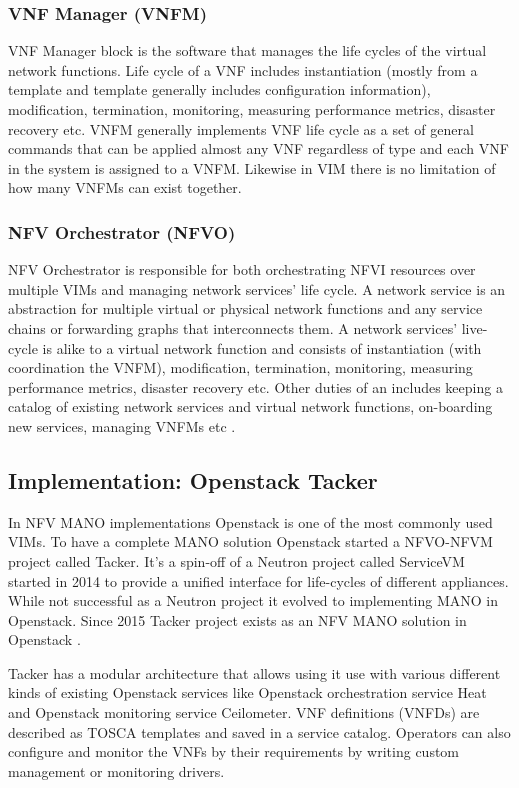 \documentclass[12pt,oneandhalf,chaparabic,ceng,ms,eng,oneside,pntc]{gsufbe}
\begin{document}
\subsubsection{VNF Manager (VNFM)}
VNF Manager block is the software that manages the life cycles of the virtual network functions. Life
cycle of a VNF includes instantiation (mostly from a template and template generally includes
configuration information), modification, termination, monitoring, measuring performance metrics,
disaster recovery etc. VNFM generally implements VNF life cycle as a set of general commands that can
be applied almost any VNF regardless of type and each VNF in the system is assigned to a VNFM.
Likewise in VIM there is no limitation of how many VNFMs can exist together.

\subsubsection{NFV Orchestrator (NFVO)}
NFV Orchestrator is responsible for both orchestrating NFVI resources over multiple VIMs and managing
network services' life cycle. A network service is an abstraction for multiple virtual or physical
network functions and any service chains or forwarding graphs that interconnects them. A network
services' live-cycle is alike to a virtual network function and consists of instantiation (with
coordination the VNFM), modification, termination, monitoring, measuring performance metrics, disaster
recovery etc. Other duties of an includes keeping a catalog of existing network services and virtual
network functions, on-boarding new services, managing VNFMs etc \cite{gonzalez_dependability_2018}.

\subsection{Implementation: Openstack Tacker}
In NFV MANO implementations Openstack \cite{openstack} is one of the most commonly used VIMs. To have
a complete MANO
solution Openstack started a NFVO-NFVM project called Tacker. It's a spin-off of a Neutron project
called ServiceVM started in 2014 to provide a unified interface for life-cycles of different
appliances. While not successful as a Neutron project it evolved to implementing MANO in Openstack.
Since 2015 Tacker project exists as an NFV MANO solution in Openstack \cite{tacker}.

Tacker has a modular architecture that allows using it use with various different kinds of
existing Openstack services like Openstack orchestration service Heat and Openstack monitoring service
Ceilometer. VNF definitions (VNFDs) are described as TOSCA templates and saved in a service catalog.
Operators can also configure and monitor the VNFs by their requirements by writing custom management or
monitoring drivers.
\end{document}
